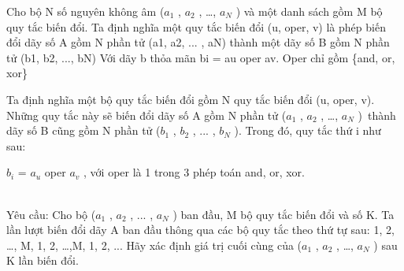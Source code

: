 Cho bộ N số nguyên không âm ($a_{1}$   , $a_{2}$   , …, $a_{N}$   ) và một danh sách gồm M bộ quy tắc biến đổi.       Ta định nghĩa một quy tắc biến đổi (u, oper, v) là phép biến đổi dãy số A gồm N phần tử (a1, a2, ... , aN) thành một dãy số B gồm N phần tử (b1, b2, ..., bN)       Với dãy b thỏa mãn       bi = au oper av. Oper chỉ gồm \{and, or, xor\}    

   Ta định nghĩa một bộ quy tắc biến đổi gồm N quy tắc biến đổi (u, oper, v). Những quy tắc này sẽ biến đổi dãy số A gồm N phần tử ($a_{1}$   , $a_{2}$   , …, $a_{N}$   ) thành dãy số B cũng gồm N phần tử ($b_{1}$   , $b_{2}$   , ... , $b_{N}$   ). Trong đó, quy tắc thứ i như sau:  

   $b_{i}$   = $a_{u}$   oper $a_{v}$   , với oper là 1 trong 3 phép toán and, or, xor.  


\\   Yêu cầu: Cho bộ ($a_{1}$   , $a_{2}$   , ... , $a_{N}$   ) ban đầu, M bộ quy tắc biến đổi và số K. Ta lần lượt biến đổi dãy A ban đầu thông qua các bộ quy tắc theo thứ tự sau: 1, 2, …, M, 1, 2, …,M, 1, 2, ... Hãy xác định giá trị cuối cùng của ($a_{1}$   , $a_{2}$   , …, $a_{N}$   ) sau K lần biến đổi.
